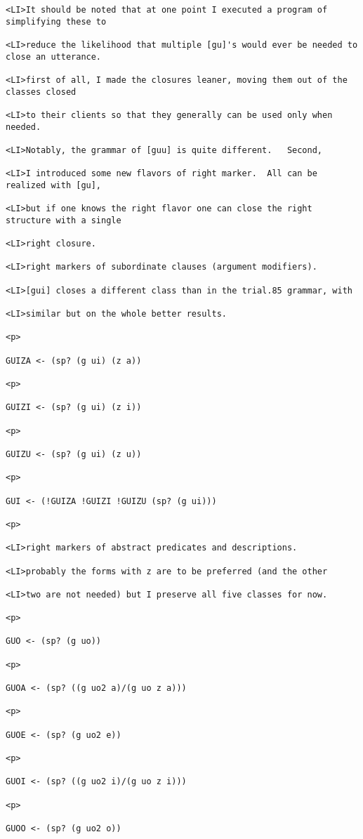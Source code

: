 \documentclass[12pt]{article}
\begin{document}
\begin{lstlisting}
<LI>It should be noted that at one point I executed a program of simplifying these to

<LI>reduce the likelihood that multiple [gu]'s would ever be needed to close an utterance.

<LI>first of all, I made the closures leaner, moving them out of the classes closed

<LI>to their clients so that they generally can be used only when needed.

<LI>Notably, the grammar of [guu] is quite different.   Second,

<LI>I introduced some new flavors of right marker.  All can be realized with [gu],

<LI>but if one knows the right flavor one can close the right structure with a single

<LI>right closure.

<LI>right markers of subordinate clauses (argument modifiers).

<LI>[gui] closes a different class than in the trial.85 grammar, with

<LI>similar but on the whole better results.

<p>

GUIZA <- (sp? (g ui) (z a))

<p>

GUIZI <- (sp? (g ui) (z i))

<p>

GUIZU <- (sp? (g ui) (z u))

<p>

GUI <- (!GUIZA !GUIZI !GUIZU (sp? (g ui)))

<p>

<LI>right markers of abstract predicates and descriptions.

<LI>probably the forms with z are to be preferred (and the other

<LI>two are not needed) but I preserve all five classes for now.

<p>

GUO <- (sp? (g uo))

<p>

GUOA <- (sp? ((g uo2 a)/(g uo z a)))

<p>

GUOE <- (sp? (g uo2 e))

<p>

GUOI <- (sp? ((g uo2 i)/(g uo z i)))

<p>

GUOO <- (sp? (g uo2 o))


\end{lstlisting}
\end{document}

